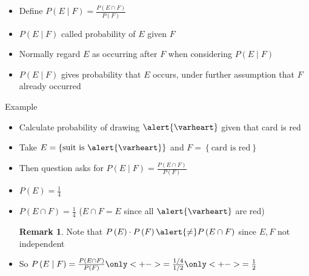 \documentclass{beamer}
\theoremstyle{definition}
\newtheorem{remark}{Remark}
\begin{document}
\begin{frame}
\begin{definition}
\begin{itemize}
\item Define $P\left(E\mid F\right)
=\frac{P\left(E\cap F\right)}{P\left(F\right)}$
\item $P\left(E\mid F\right)$ called
\alert{probability of $E$ given $F$}
\end{itemize}
\end{definition}
\begin{itemize}
\item Normally regard $E$ as occurring
\alert{after} $F$ when considering $P\left(E\mid F\right)$
\item $P\left(E\mid F\right)$ gives probability that $E$ occurs,
under further assumption that $F$ already occurred
\end{itemize}
\end{frame}

\begin{frame}{Example}
\begin{itemize}
\item Calculate probability of drawing $\alert{\varheart}$ given
that card is red
\item Take $E=\left\{\text{suit is $\alert{\varheart}$}\right\}$
and $F=\left\{\text{card is red}\right\}$
\item Then question asks for $P\left(E\mid F\right)
=\frac{P\left(E\cap F\right)}{P\left(F\right)}$
\item $P\left(E\right)=\frac{1}{4}$\qquad
{}
\item $P\left(E\cap F\right)=\frac{1}{4}$\qquad
($E\cap F=E$ since all $\alert{\varheart}$ are red)
\begin{remark}
Note that $P\left(E\right)\cdot P\left(F\right)\alert{\ne}
P\left(E\cap F\right)$
since $E,F$ not independent
\end{remark}
\item So $P\left(E\mid F\right)
=\frac{P\left(E\cap F\right)}{P\left(F\right)}
\only<+->{=\frac{1/4}{1/2}}
\only<+->{=\frac{1}{2}}$
\end{itemize}
\end{frame}
\end{document}
